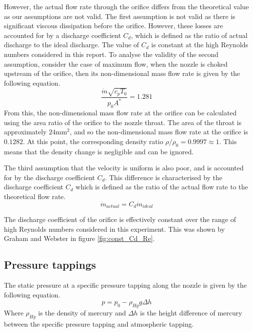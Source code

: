 \documentclass{article}
\begin{document}
However, the actual flow rate through the orifice differs from the theoretical value as our assumptions are not valid.
The first assumption is not valid as there is significant viscous dissipation before the orifice. However, these losses are accounted for by a discharge coefficient $C_d$, which is defined as the ratio of actual discharge to the ideal discharge.
The value of $C_d$ is constant at the high Reynolds numbers considered in this report.
To analyse the validity of the second assumption, consider the case of maximum flow, when the nozzle is choked upstream of the orifice, then its non-dimensional mass flow rate is given by the following equation.
\begin{equation}
    \frac{\dot{m}\sqrt{c_pT_0}}{p_0A^*} = 1.281
\end{equation}
From this, the non-dimensional mass flow rate at the orifice can be calculated using the area ratio of the orifice to the nozzle throat.
The area of the throat is approximately $24\text{mm}^2$, and so the non-dimensional mass flow rate at the orifice is $0.1282$.
At this point, the corresponding density ratio $\rho/\rho_0 = 0.9997 \approx 1$. This means that the density change is negligible and can be ignored.

The third assumption that the velocity is uniform is also poor, and is accounted for by the discharge coefficient $C_d$.
This difference is characterised by the discharge coefficient $C_d$ which is defined as the ratio of the actual flow rate to the theoretical flow rate.
\begin{equation}
    \dot{m}_{actual} = C_d \dot{m}_{ideal}
\end{equation}

The discharge coefficient of the orifice is effectively constant over the range of high Reynolds numbers considered in this experiment.
This was shown by Graham and Webster \cite{Graham_K_Webster:2019} in figure \ref{fig:const_Cd_Re}.

\subsection{Pressure tappings}

The static pressure at a specific pressure tapping along the nozzle is given by the following equation.
\begin{equation}
    p = p_0 - \rho_{Hg} g \Delta h
\end{equation}
Where $\rho_{Hg}$ is the density of mercury and $\Delta h$ is the height difference of mercury between the specific pressure tapping and atmospheric tapping.
\end{document}
